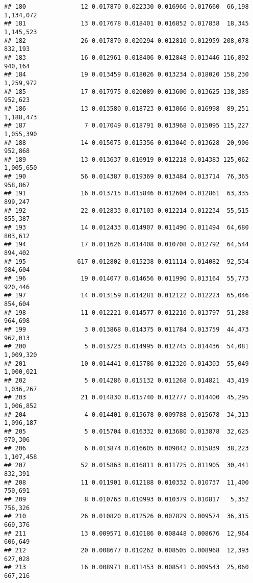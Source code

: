 \documentclass[]{article}
\begin{document}
\begin{verbatim}
## 180               12 0.017870 0.022330 0.016966 0.017660  66,198 1,134,072
## 181               13 0.017678 0.018401 0.016852 0.017838  18,345 1,145,523
## 182               26 0.017870 0.020294 0.012810 0.012959 208,078   832,193
## 183               16 0.012961 0.018406 0.012848 0.013446 116,892   940,164
## 184               19 0.013459 0.018026 0.013234 0.018020 158,230 1,259,972
## 185               17 0.017975 0.020089 0.013600 0.013625 138,385   952,623
## 186               13 0.013580 0.018723 0.013066 0.016998  89,251 1,188,473
## 187                7 0.017049 0.018791 0.013968 0.015095 115,227 1,055,390
## 188               14 0.015075 0.015356 0.013040 0.013628  20,906   952,868
## 189               13 0.013637 0.016919 0.012218 0.014383 125,062 1,005,650
## 190               56 0.014387 0.019369 0.013484 0.013714  76,365   958,867
## 191               16 0.013715 0.015846 0.012604 0.012861  63,335   899,247
## 192               22 0.012833 0.017103 0.012214 0.012234  55,515   855,387
## 193               14 0.012433 0.014907 0.011490 0.011494  64,680   803,612
## 194               17 0.011626 0.014408 0.010708 0.012792  64,544   894,402
## 195              617 0.012802 0.015238 0.011114 0.014082  92,534   984,604
## 196               19 0.014077 0.014656 0.011990 0.013164  55,773   920,446
## 197               14 0.013159 0.014281 0.012122 0.012223  65,046   854,604
## 198               11 0.012221 0.014577 0.012210 0.013797  51,288   964,698
## 199                3 0.013868 0.014375 0.011784 0.013759  44,473   962,013
## 200                5 0.013723 0.014995 0.012745 0.014436  54,081 1,009,320
## 201               10 0.014441 0.015786 0.012320 0.014303  55,049 1,000,021
## 202                5 0.014286 0.015132 0.011268 0.014821  43,419 1,036,267
## 203               21 0.014830 0.015740 0.012777 0.014400  45,295 1,006,852
## 204                4 0.014401 0.015678 0.009788 0.015678  34,313 1,096,187
## 205                5 0.015704 0.016332 0.013680 0.013878  32,625   970,306
## 206                6 0.013874 0.016605 0.009042 0.015839  38,223 1,107,458
## 207               52 0.015863 0.016811 0.011725 0.011905  30,441   832,391
## 208               11 0.011901 0.012188 0.010332 0.010737  11,400   750,691
## 209                8 0.010763 0.010993 0.010379 0.010817   5,352   756,326
## 210               26 0.010820 0.012526 0.007829 0.009574  36,315   669,376
## 211               13 0.009571 0.010186 0.008448 0.008676  12,964   606,649
## 212               20 0.008677 0.010262 0.008505 0.008968  12,393   627,028
## 213               16 0.008971 0.011453 0.008541 0.009543  25,060   667,216

\end{verbatim}
\end{document}

